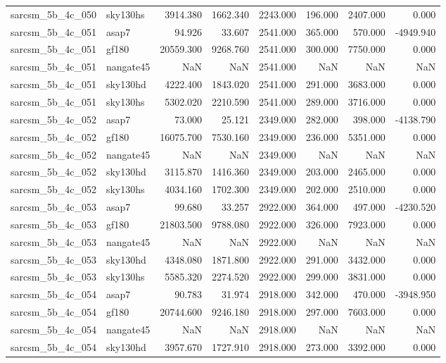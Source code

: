 \begin{tabular}{llrrrrrr}
sarcsm\_5b\_4c\_050 & sky130hs & 3914.380 & 1662.340 & 2243.000 & 196.000 & 2407.000 & 0.000 \\
sarcsm\_5b\_4c\_051 & asap7 & 94.926 & 33.607 & 2541.000 & 365.000 & 570.000 & -4949.940 \\
sarcsm\_5b\_4c\_051 & gf180 & 20559.300 & 9268.760 & 2541.000 & 300.000 & 7750.000 & 0.000 \\
sarcsm\_5b\_4c\_051 & nangate45 & NaN & NaN & 2541.000 & NaN & NaN & NaN \\
sarcsm\_5b\_4c\_051 & sky130hd & 4222.400 & 1843.020 & 2541.000 & 291.000 & 3683.000 & 0.000 \\
sarcsm\_5b\_4c\_051 & sky130hs & 5302.020 & 2210.590 & 2541.000 & 289.000 & 3716.000 & 0.000 \\
sarcsm\_5b\_4c\_052 & asap7 & 73.000 & 25.121 & 2349.000 & 282.000 & 398.000 & -4138.790 \\
sarcsm\_5b\_4c\_052 & gf180 & 16075.700 & 7530.160 & 2349.000 & 236.000 & 5351.000 & 0.000 \\
sarcsm\_5b\_4c\_052 & nangate45 & NaN & NaN & 2349.000 & NaN & NaN & NaN \\
sarcsm\_5b\_4c\_052 & sky130hd & 3115.870 & 1416.360 & 2349.000 & 203.000 & 2465.000 & 0.000 \\
sarcsm\_5b\_4c\_052 & sky130hs & 4034.160 & 1702.300 & 2349.000 & 202.000 & 2510.000 & 0.000 \\
sarcsm\_5b\_4c\_053 & asap7 & 99.680 & 33.257 & 2922.000 & 364.000 & 497.000 & -4230.520 \\
sarcsm\_5b\_4c\_053 & gf180 & 21803.500 & 9788.080 & 2922.000 & 326.000 & 7923.000 & 0.000 \\
sarcsm\_5b\_4c\_053 & nangate45 & NaN & NaN & 2922.000 & NaN & NaN & NaN \\
sarcsm\_5b\_4c\_053 & sky130hd & 4348.080 & 1871.800 & 2922.000 & 291.000 & 3432.000 & 0.000 \\
sarcsm\_5b\_4c\_053 & sky130hs & 5585.320 & 2274.520 & 2922.000 & 299.000 & 3831.000 & 0.000 \\
sarcsm\_5b\_4c\_054 & asap7 & 90.783 & 31.974 & 2918.000 & 342.000 & 470.000 & -3948.950 \\
sarcsm\_5b\_4c\_054 & gf180 & 20744.600 & 9246.180 & 2918.000 & 297.000 & 7603.000 & 0.000 \\
sarcsm\_5b\_4c\_054 & nangate45 & NaN & NaN & 2918.000 & NaN & NaN & NaN \\
sarcsm\_5b\_4c\_054 & sky130hd & 3957.670 & 1727.910 & 2918.000 & 273.000 & 3392.000 & 0.000 \\

\end{tabular}
